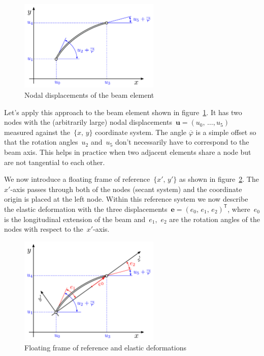 \begin{figure}[h]
\centering
\includegraphics[width=0.6\textwidth]{figures/elements/beam-element-1}
\caption{Nodal displacements of the beam element}
\label{fig:beam-element-1}
\end{figure}

Let's apply this approach to the beam element shown in figure~\ref{fig:beam-element-1}. It has two nodes with the (arbitrarily large) nodal displacements~$\boldsymbol{u} = (u_0,\,\ldots,u_5)$ measured against the~$\{x,\,y\}$ coordinate system. The angle $\overline{\varphi}$ is a simple offset so that the rotation angles~$u_2$ and~$u_5$ don't necessarily have to correspond to the beam axis. This helps in practice when two adjacent elements share a node but are not tangential to each other.

We now introduce a floating frame of reference~$\{x',\,y'\}$ as shown in figure~\ref{fig:beam-element-2}. The $x'$-axis passes through both of the nodes (secant system) and the coordinate origin is placed at the left node. Within this reference system we now describe the elastic deformation with the three displacements~$\boldsymbol{e} = (e_0,\,e_1,\,e_2)^\mathsf{T}$, where~$e_0$ is the longitudinal extension of the beam and~$e_1$,~$e_2$ are the rotation angles of the nodes with respect to the~$x'$-axis.

\begin{figure}[h]
\centering
\includegraphics[width=0.6\textwidth]{figures/elements/beam-element-2}
\caption{Floating frame of reference and elastic deformations}
\label{fig:beam-element-2}
\end{figure}

